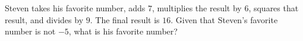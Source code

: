 Steven takes his favorite number, adds $7$, multiplies the result by $6$, squares that result, and divides by $9$. The final result is $16$. Given that Steven's favorite number is not $-5$, what is his favorite number?
